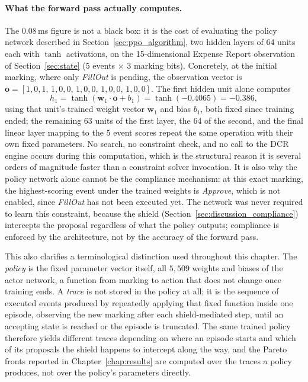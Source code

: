 \paragraph{What the forward pass actually computes.} The 0.08\,ms figure is not a black box: it is the cost of evaluating the policy network described in Section~\ref{sec:ppo_algorithm}, two hidden layers of 64 units each with $\tanh$ activations, on the 15-dimensional Expense Report observation of Section~\ref{sec:state} (5 events $\times$ 3 marking bits). Concretely, at the initial marking, where only \textit{FillOut} is pending, the observation vector is $\mathbf{o} = [1,0,1,\,1,0,0,\,1,0,0,\,1,0,0,\,1,0,0]$. The first hidden unit alone computes
\[
h_1 = \tanh\!\left(\mathbf{w}_1 \cdot \mathbf{o} + b_1\right) = \tanh(-0.4065) = -0.386,
\]
using that unit's trained weight vector $\mathbf{w}_1$ and bias $b_1$, both fixed since training ended; the remaining 63 units of the first layer, the 64 of the second, and the final linear layer mapping to the 5 event scores repeat the same operation with their own fixed parameters. No search, no constraint check, and no call to the \ac{DCR} engine occurs during this computation, which is the structural reason it is several orders of magnitude faster than a constraint solver invocation. It is also why the policy network alone cannot be the compliance mechanism: at this exact marking, the highest-scoring event under the trained weights is \textit{Approve}, which is not enabled, since \textit{FillOut} has not been executed yet. The network was never required to learn this constraint, because the shield (Section~\ref{sec:discussion_compliance}) intercepts the proposal regardless of what the policy outputs; compliance is enforced by the architecture, not by the accuracy of the forward pass.

This also clarifies a terminological distinction used throughout this chapter. The \emph{policy} is the fixed parameter vector itself, all $5{,}509$ weights and biases of the actor network, a function from marking to action that does not change once training ends. A \emph{trace} is not stored in the policy at all; it is the sequence of executed events produced by repeatedly applying that fixed function inside one episode, observing the new marking after each shield-mediated step, until an accepting state is reached or the episode is truncated. The same trained policy therefore yields different traces depending on where an episode starts and which of its proposals the shield happens to intercept along the way, and the Pareto fronts reported in Chapter~\ref{chap:results} are computed over the traces a policy produces, not over the policy's parameters directly.


